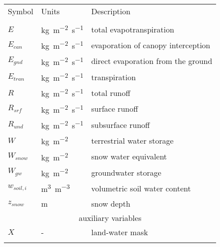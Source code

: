 \begin{tabular}{lll}
  \tophline
  Symbol         & Units                   & Description \\
  \middlehline
  \multicolumn{3}{c}{surface water budget} \\
  \(E\)          & \unit{kg.m^{-2}.s^{-1}} & total evapotranspiration \\
  \(E_{can}\)    & \unit{kg.m^{-2}.s^{-1}} & evaporation of canopy interception \\
  \(E_{gnd}\)    & \unit{kg.m^{-2}.s^{-1}} & direct evaporation from the ground \\
  \(E_{tran}\)   & \unit{kg.m^{-2}.s^{-1}} & transpiration \\
  \(R\)          & \unit{kg.m^{-2}.s^{-1}} & total runoff \\
  \(R_{srf}\)    & \unit{kg.m^{-2}.s^{-1}} & surface runoff \\
  \(R_{und}\)    & \unit{kg.m^{-2}.s^{-1}} & subsurface runoff \\
  \(W\)          & \unit{kg.m^{-2}}        & terrestrial water storage \\
  \(W_{snow}\)   & \unit{kg.m^{-2}}        & snow water equivalent \\
  \(W_{gw}\)     & \unit{kg.m^{-2}}        & groundwater storage \\
  \(w_{soil,i}\) & \unit{m^3.m^{-3}}       & volumetric soil water content \\
  \(z_{snow}\)   & \unit{m}                & snow depth \\
  [1pt]
  \multicolumn{3}{c}{auxiliary variables} \\
  \(X\)          & -                       & land-water mask \\
  \bottomhline
\end{tabular}
